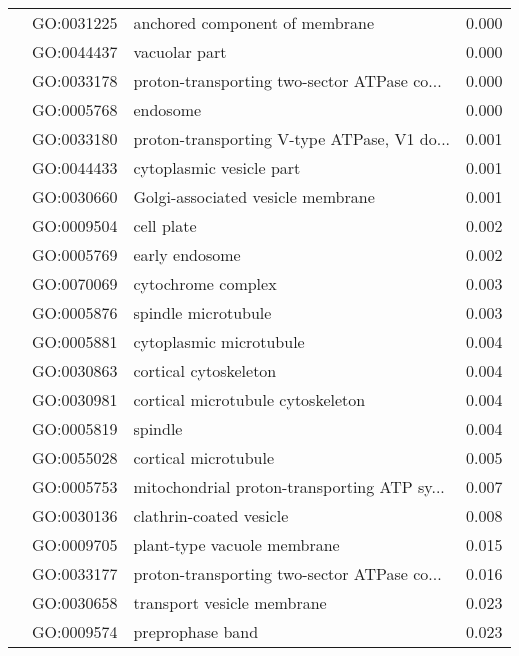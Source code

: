 \begin{longtable}{lllr}
   & GO:0031225 &               anchored component of membrane &         0.000 \\
   & GO:0044437 &                                vacuolar part &         0.000 \\
   & GO:0033178 &  proton-transporting two-sector ATPase co... &         0.000 \\
   & GO:0005768 &                                     endosome &         0.000 \\
   & GO:0033180 &  proton-transporting V-type ATPase, V1 do... &         0.001 \\
   & GO:0044433 &                     cytoplasmic vesicle part &         0.001 \\
   & GO:0030660 &            Golgi-associated vesicle membrane &         0.001 \\
   & GO:0009504 &                                   cell plate &         0.002 \\
   & GO:0005769 &                               early endosome &         0.002 \\
   & GO:0070069 &                           cytochrome complex &         0.003 \\
   & GO:0005876 &                          spindle microtubule &         0.003 \\
   & GO:0005881 &                      cytoplasmic microtubule &         0.004 \\
   & GO:0030863 &                        cortical cytoskeleton &         0.004 \\
   & GO:0030981 &            cortical microtubule cytoskeleton &         0.004 \\
   & GO:0005819 &                                      spindle &         0.004 \\
   & GO:0055028 &                         cortical microtubule &         0.005 \\
   & GO:0005753 &  mitochondrial proton-transporting ATP sy... &         0.007 \\
   & GO:0030136 &                      clathrin-coated vesicle &         0.008 \\
   & GO:0009705 &                  plant-type vacuole membrane &         0.015 \\
   & GO:0033177 &  proton-transporting two-sector ATPase co... &         0.016 \\
   & GO:0030658 &                   transport vesicle membrane &         0.023 \\
   & GO:0009574 &                             preprophase band &         0.023 \\

\end{longtable}
